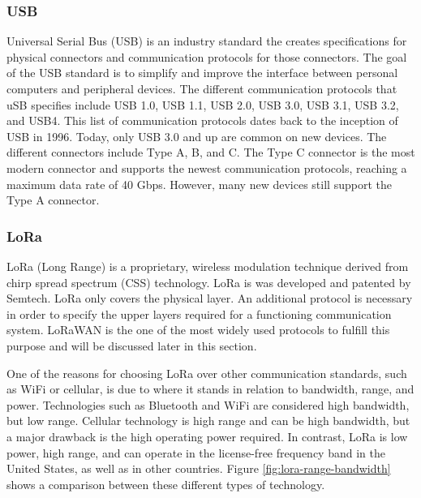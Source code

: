 \subsubsection{USB}
Universal Serial Bus (USB) is an industry standard the creates specifications for physical connectors and communication protocols for those connectors. The goal of the USB standard is to simplify and improve the interface between personal computers and peripheral devices. The different communication protocols that uSB specifies include USB 1.0, USB 1.1, USB 2.0, USB 3.0, USB 3.1, USB 3.2, and USB4. This list of communication protocols dates back to the inception of USB in 1996. Today, only USB 3.0 and up are common on new devices. The different connectors include Type A, B, and C. The Type C connector is the most modern connector and supports the newest communication protocols, reaching a maximum data rate of 40 Gbps. However, many new devices still support the Type A connector. 

\subsubsection{LoRa}
LoRa (Long Range) is a proprietary, wireless modulation technique derived from chirp spread spectrum (CSS) technology. LoRa is was developed and patented by Semtech. LoRa only covers the physical layer. An additional protocol is necessary in order to specify the upper layers required for a functioning communication system. LoRaWAN is the one of the most widely used protocols to fulfill this purpose and will be discussed later in this section.

One of the reasons for choosing LoRa over other communication standards, such as WiFi or cellular, is due to where it stands in relation to bandwidth, range, and power. Technologies such as Bluetooth and WiFi are considered high bandwidth, but low range. Cellular technology is high range and can be high bandwidth, but a major drawback is the high operating power required. In contrast, LoRa is low power, high range, and can operate in the license-free frequency band in the United States, as well as in other countries. Figure \ref{fig:lora-range-bandwidth} shows a comparison between these different types of technology.

